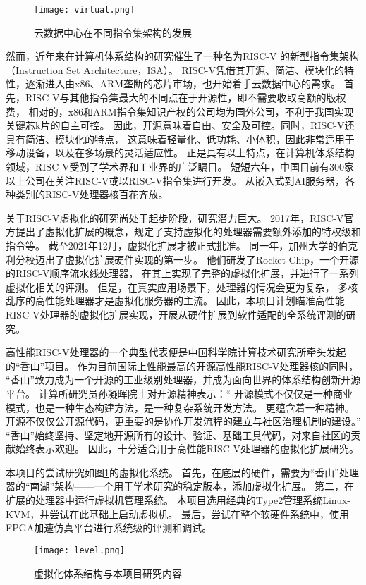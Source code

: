 \begin{figure}[htbp]
\centering
\texttt{[image: virtual.png]}
\caption{云数据中心在不同指令集架构的发展}
\end{figure}

然而，近年来在计算机体系结构的研究催生了一种名为RISC-V\cite{asanovic2014instruction}
的新型指令集架构（Instruction Set Architecture，ISA）。
RISC-V凭借其开源、简洁、模块化的特性，逐渐进入由x86、ARM垄断的芯片市场，也开始着手云数据中心的需求。
首先，RISC-V与其他指令集最大的不同点在于开源性，即不需要收取高额的版权费，
相对的，x86和ARM指令集知识产权的公司均为国外公司，不利于我国实现关键芯k片的自主可控。
因此，开源意味着自由、安全及可控。同时，RISC-V还具有简洁、模块化的特点，
这意味着轻量化、低功耗、小体积，因此非常适用于移动设备，以及在多场景的灵活适应性。
正是具有以上特点，在计算机体系结构领域，RISC-V受到了学术界和工业界的广泛瞩目。
短短六年，中国目前有300家以上公司在关注RISC-V或以RISC-V指令集进行开发。
从嵌入式到AI服务器，各种类别的RISC-V处理器核百花齐放。

关于RISC-V虚拟化的研究尚处于起步阶段，研究潜力巨大。
2017年，RISC-V官方提出了虚拟化扩展的概念，规定了支持虚拟化的处理器需要额外添加的特权级和指令等。
截至2021年12月，虚拟化扩展才被正式批准。
同一年，加州大学的伯克利分校迈出了虚拟化扩展硬件实现的第一步。
他们研发了Rocket Chip\cite{itco2022rocket}，一个开源的RISC-V顺序流水线处理器，
在其上实现了完整的虚拟化扩展，并进行了一系列虚拟化相关的评测。
但是，在真实应用场景下，处理器的情况会更为复杂，
多核乱序的高性能处理器才是虚拟化服务器的主流。
因此，本项目计划瞄准高性能RISC-V处理器的虚拟化扩展实现，开展从硬件扩展到软件适配的全系统评测的研究。

高性能RISC-V处理器的一个典型代表便是中国科学院计算技术研究所牵头发起的“香山”项目。
作为目前国际上性能最高的开源高性能RISC-V处理器核的同时，
“香山”致力成为一个开源的工业级别处理器，并成为面向世界的体系结构创新开源平台。
计算所研究员孙凝晖院士对开源精神表示：“
开源模式不仅仅是一种商业模式，也是一种生态构建方法，是一种复杂系统开发方法。
更蕴含着一种精神。开源不仅仅公开源代码，更重要的是协作开发流程的建立与社区治理机制的建设。”
“香山”始终坚持、坚定地开源所有的设计、验证、基础工具代码，对来自社区的贡献始终表示欢迎。
因此，十分适合用于高性能RISC-V处理器的虚拟化扩展研究。

本项目的尝试研究如图\ref{fig:level}的虚拟化系统。
首先，在底层的硬件，需要为“香山”处理器的“南湖”架构——一个用于学术研究的稳定版本，添加虚拟化扩展。
第二，在扩展的处理器中运行虚拟机管理系统。
本项目选用经典的Type2管理系统Linux-KVM\cite{kvm:H-ext}，并尝试在此基础上启动虚拟机。
最后，尝试在整个软硬件系统中，使用FPGA加速仿真平台进行系统级的评测和调试。

\begin{figure}[htbp]
    \centering
    \texttt{[image: level.png]}
\caption{虚拟化体系结构与本项目研究内容}
    \label{fig:level}
\end{figure}
